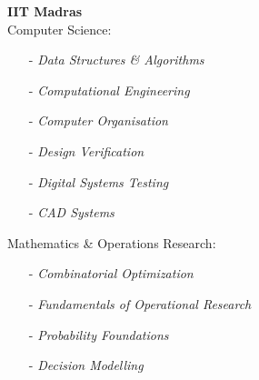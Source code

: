 \documentclass[margin,line,letter]{resume}
\begin{document}
\begin{resume}
    \vspace{-0.4cm}
    \textbf{IIT Madras}
        \vspace{0.15cm} \\
        \phantom{xx}\hspace{0ex} Computer Science:
        \vspace{-0.3cm}
        \begin{multicols}{2}
        \begin{itemize}
        \item[-] \emph{Data Structures \& Algorithms}
        \item[-] \emph{Computational Engineering}
        \item[-] \emph{Computer Organisation}
        \item[-] \emph{Design Verification}
        \item[-] \emph{Digital Systems Testing}
        \item[-] \emph{CAD Systems}
        \end{itemize}
        \end{multicols}
        
        \vspace{-0.6cm}
        \phantom{xx}\hspace{0ex} Mathematics \& Operations Research:
        \vspace{-0.3cm}
        \begin{multicols}{2}
        \begin{itemize}
        \item[-] \emph{Combinatorial Optimization}
        \item[-] \emph{Fundamentals of Operational Research}
        \item[-] \emph{Probability Foundations}
        \item[-] \emph{Decision Modelling}
        \end{itemize}
        \end{multicols}


\end{resume}
\end{document}
